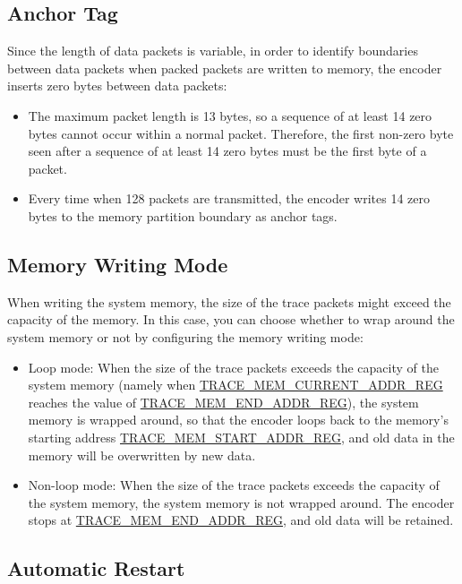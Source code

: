 \documentclass[main\_\_EN.tex]{subfiles}
\begin{document}
\subsection{Anchor Tag}

Since the length of data packets is variable, in order to identify boundaries between data packets when packed packets are written to memory, the \chipname{} encoder inserts zero bytes between data packets:
\begin{itemize}
    \item The maximum packet length is 13 bytes, so a sequence of at least 14 zero bytes cannot occur within a normal packet. Therefore, the first non-zero byte seen after a sequence of at least 14 zero bytes must be the first byte of a packet.
    \item Every time when 128 packets are transmitted, the encoder writes 14 zero bytes to the memory partition boundary as anchor tags.
\end{itemize}

\subsection{Memory Writing Mode}

When writing the system memory, the size of the trace packets might exceed the capacity of the memory. In this case, you can choose whether to wrap around the system memory or not by configuring the memory writing mode:

\begin{itemize}
    \item Loop mode: When the size of the trace packets exceeds the capacity of the system memory (namely when \hyperref[regdesc:TRACEMEMCURRENTADDRREG]{TRACE\_MEM\_CURRENT\_ADDR\_REG} reaches the value of \hyperref[regdesc:TRACEMEMENDADDRREG]{TRACE\_MEM\_END\_ADDR\_REG}), the system memory is wrapped around, so that the encoder loops back to the memory's starting address \hyperref[regdesc:TRACEMEMSTARTADDRREG]{TRACE\_MEM\_START\_ADDR\_REG}, and old data in the memory will be overwritten by new data.
    \item Non-loop mode: When the size of the trace packets exceeds the capacity of the system memory, the system memory is not wrapped around. The encoder stops at \hyperref[regdesc:TRACEMEMENDADDRREG]{TRACE\_MEM\_END\_ADDR\_REG}, and old data will be retained.
\end{itemize}

\subsection{Automatic Restart}
\end{document}
